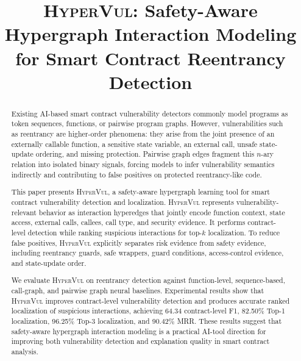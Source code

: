 \documentclass[conference]{IEEEtran}
\newcommand{\tool}{\textsc{HyperVul}}
\begin{document}
\title{\tool{}: Safety-Aware Hypergraph Interaction Modeling for Smart Contract Reentrancy Detection}

\author{
}

\maketitle

\begin{abstract}
Existing AI-based smart contract vulnerability detectors commonly model programs as token sequences, functions, or pairwise program graphs. However, vulnerabilities such as reentrancy are higher-order phenomena: they arise from the joint presence of an externally callable function, a sensitive state variable, an external call, unsafe state-update ordering, and missing protection. Pairwise graph edges fragment this $n$-ary relation into isolated binary signals, forcing models to infer vulnerability semantics indirectly and contributing to false positives on protected reentrancy-like code.

This paper presents \tool{}, a safety-aware hypergraph learning tool for smart contract vulnerability detection and localization. \tool{} represents vulnerability-relevant behavior as interaction hyperedges that jointly encode function context, state access, external calls, callees, call type, and security evidence. It performs contract-level detection while ranking suspicious interactions for top-$k$ localization. To reduce false positives, \tool{} explicitly separates risk evidence from safety evidence, including reentrancy guards, safe wrappers, guard conditions, access-control evidence, and state-update order.

We evaluate \tool{} on reentrancy detection against function-level, sequence-based, call-graph, and pairwise graph neural baselines. Experimental results show that \tool{} improves contract-level vulnerability detection and produces accurate ranked localization of suspicious interactions, achieving 64.34 contract-level F1, 82.50\% Top-1 localization, 96.25\% Top-3 localization, and 90.42\% MRR. These results suggest that safety-aware hypergraph interaction modeling is a practical AI-tool direction for improving both vulnerability detection and explanation quality in smart contract analysis.
\end{abstract}
\end{document}
